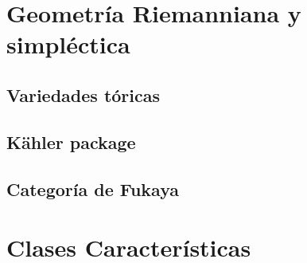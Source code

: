 \documentclass[12pt]{book}
\begin{document}
	
\part{Geometría Riemanniana y simpléctica}
	
	
	
	
	
\chapter{Variedades tóricas}	


\chapter{Kähler package}


\chapter{Categoría de Fukaya}


	
\part{Clases Características}





	
\end{document}
